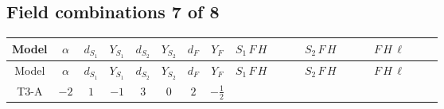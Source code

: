 \documentclass[8pt]{article}
\begin{document}
\begin{landscape}
\subsection*{Field combinations 7 of 8}
\begin{longtable}{@{}cccccccc >{\raggedright\arraybackslash}p{0.21\linewidth} >{\raggedright\arraybackslash}p{0.21\linewidth} >{\raggedright\arraybackslash}p{0.21\linewidth}@{}}
\toprule
Model & $\alpha$ & $d_{S_1}$ & $Y_{S_1}$ & $d_{S_2}$ & $Y_{S_2}$ & $d_F$ & $Y_F$ & $S_1\,F\,H$ & $S_2\,F\,H$ & $F\,H\,\ell$ \\
\midrule
\endfirsthead
\toprule
Model & $\alpha$ & $d_{S_1}$ & $Y_{S_1}$ & $d_{S_2}$ & $Y_{S_2}$ & $d_F$ & $Y_F$ & $S_1\,F\,H$ & $S_2\,F\,H$ & $F\,H\,\ell$ \\
\midrule
\endhead
T3-A & $-2$ & $1$ & $-1$ & $3$ & $0$ & $2$ & $-\frac{1}{2}$ & \scriptsize\adjustbox{max width=\linewidth}{$\begin{gathered} -2 \hbar  \log \left(\frac{\bar{\mu}^{2}}{M_F^2}\right) \overline{y_{1,i_1,r_1}} \overline{Y_{e,i_2,i_3}} H_{a_1} S_1 y_{1,i_2,r_1} Y_{e,i_1,i_3} H_{a_1}{}^{\dagger } S_1{}^{\dagger } \\ -2 \hbar  \log \left(\frac{\bar{\mu}^{2}}{M_F^2}\right) \overline{y_{1,i_1,r_1}} H_{a_2} S_1 y_{1,i_1,r_1} H_{a_1}{}^{\dagger } S_1{}^{\dagger } \mathcal{I}_{H1,a_1,a_2}{}^1 \lambda_{HS_1}^{(1)}^{(1)}\end{gathered}$} & \scriptsize\adjustbox{max width=\linewidth}{$\begin{gathered} -\frac{2 \hbar  \log \left(\frac{\bar{\mu}^{2}}{M_F^2}\right) \overline{y_{2,i_1,r_1}} \overline{Y_{e,i_2,i_3}} H_{a_1} S_{2,j_1} y_{2,i_2,r_1} Y_{e,i_1,i_3} H_{a_1}{}^{\dagger } S_{2,j_1}{}^{\dagger }}{\sqrt{3}} \\ -2 i \sqrt{\frac{2}{3}} \hbar  \log \left(\frac{\bar{\mu}^{2}}{M_F^2}\right) \overline{y_{2,i_1,r_1}} \overline{Y_{e,i_2,i_3}} H_{a_2} S_{2,j_2} y_{2,i_2,r_1} Y_{e,i_1,i_3} H_{a_1}{}^{\dagger } S_{2,j_1}{}^{\dagger } \mathcal{I}_{H2,a_1,a_2,j_1,j_2}{}^1 \\ -\frac{2 \hbar  \log \left(\frac{\bar{\mu}^{2}}{M_F^2}\right) \overline{y_{2,i_1,r_1}} H_{a_2} S_{2,j_2} y_{2,i_1,r_1} H_{a_1}{}^{\dagger } S_{2,j_1}{}^{\dagger } \mathcal{I}_{H2,a_1,a_2,j_1,j_2}{}^2 \lambda_{HS_2}^{(1)}^{(2)}}{\sqrt{3}}\end{gathered}$} & \scriptsize\adjustbox{max width=\linewidth}{$\begin{gathered} +\frac{2 \hbar  \log \left(\frac{\bar{\mu}^{2}}{M_F^2}\right) \overline{y_{1,i_1,r_1}} \overline{y_{2,i_2,r_1}} L_{a_4,i_2}{}^T\, C\, P_L\, L_{a_2,i_1} H_{a_1} H_{a_3} \lambda_5 \epsilon_{a_1,a_2} \epsilon_{a_3,a_4}}{\sqrt{3} M_F} \\ +\frac{2 \hbar  \log \left(\frac{\bar{\mu}^{2}}{M_F^2}\right) \overline{\lambda_5} \overline{L_{a_3,i_1}}\, C\, P_R\, \overline{L_{a_4,i_2}}{}^T y_{1,i_1,r_1} y_{2,i_2,r_1} \epsilon_{a_1,a_3} \epsilon_{a_2,a_4} H_{a_1}{}^{\dagger } H_{a_2}{}^{\dagger }}{\sqrt{3} M_F}\end{gathered}$} \\
\midrule
\bottomrule
\end{longtable}
\clearpage

\end{landscape}
\end{document}
